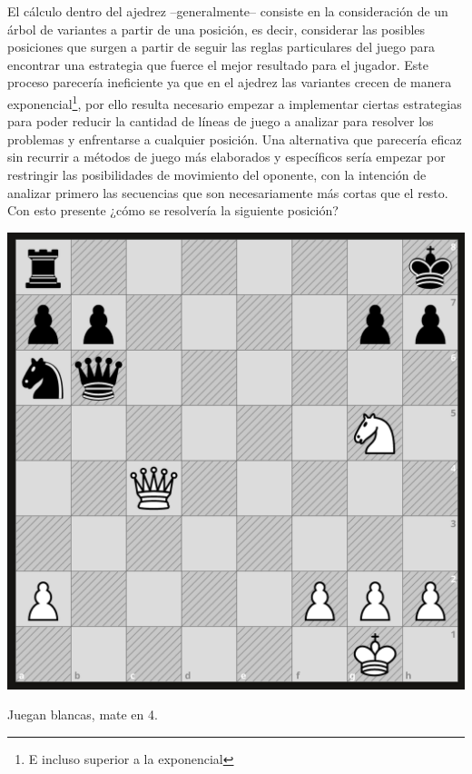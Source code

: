 \documentclass[twoside,openright,12pt,a4paper,spanish]{book}
\begin{document}
El cálculo dentro del ajedrez --generalmente-- consiste en la consideración de un árbol de variantes  a partir de una posición, es decir, considerar las posibles posiciones que surgen a partir de seguir las reglas particulares del juego para encontrar una estrategia que fuerce el mejor resultado para el jugador. Este proceso parecería ineficiente ya que en el ajedrez las variantes crecen de manera exponencial\footnote{E incluso superior a la exponencial}, por ello resulta necesario empezar a implementar ciertas estrategias para poder reducir la cantidad de líneas de juego a analizar para resolver los problemas y enfrentarse a cualquier posición. Una alternativa que parecería eficaz sin recurrir a métodos de juego más elaborados y específicos sería empezar por restringir las posibilidades de movimiento del oponente, con la intención de analizar primero las secuencias que son necesariamente más cortas que el resto. Con esto presente ¿cómo se resolvería la siguiente posición?


\medskip
\begin{center}
    \includegraphics[width=8.0 cm,height=8.0 cm]{mate_de_la_coz.png}

    Juegan blancas, mate en 4.
\end{center}
\end{document}
